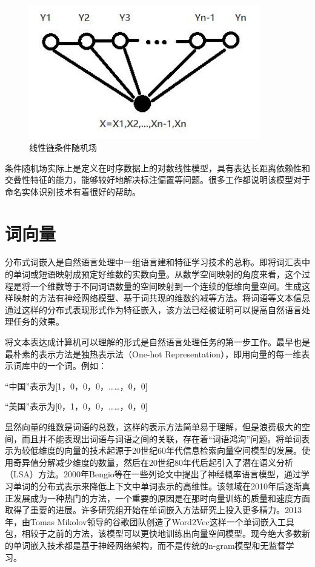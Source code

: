 \documentclass[winfonts,master,oneside,nobackinfo]{njuthesis}
\begin{document}
\begin{figure}[ht]
\centering
\begin{minipage}[t]{0.5\textwidth}
\includegraphics[width=0.9\textwidth]{./figure/线性链条件随机场.jpg}
\caption{线性链条件随机场}
\label{lab:1}
\end{minipage}
\end{figure}

条件随机场实际上是定义在时序数据上的对数线性模型，具有表达长距离依赖性和交叠性特征的能力，能够较好地解决标注偏置等问题。很多工作都说明该模型对于命名实体识别技术有着很好的帮助\cite{Settles}。

\section{词向量}
分布式词嵌入是自然语言处理中一组语言建和特征学习技术的总称。即将词汇表中的单词或短语映射成预定好维数的实数向量。从数学空间映射的角度来看，这个过程是将一个维数等于不同词语数量的空间映射到一个连续的低维向量空间。生成这样映射的方法有神经网络模型、基于词共现的维数约减等方法。将词语等文本信息通过这样的分布式表现形式作为特征嵌入，该方法已经被证明可以提高自然语言处理任务的效果。

将文本表达成计算机可以理解的形式是自然语言处理任务的第一步工作。最早也是最朴素的表示方法是独热表示法（One-hot Representation），即用向量的每一维表示词库中的一个词。例如：

“中国”表示为[1，0，0，0，……，0，0]

“美国”表示为[0，1，0，0，……，0，0]

显然向量的维数是词语的总数，这样的表示方法简单易于理解，但是浪费极大的空间，而且并不能表现出词语与词语之间的关联，存在着“词语鸿沟”问题。将单词表示为较低维度的向量的技术起源于20世纪60年代信息检索向量空间模型的发展。使用奇异值分解减少维度的数量，然后在20世纪80年代后起引入了潜在语义分析（LSA）方法。2000年Bengio等\cite{Bengio}在一些列论文中提出了神经概率语言模型，通过学习单词的分布式表示来降低上下文中单词表示的高维性。该领域在2010年后逐渐真正发展成为一种热门的方法，一个重要的原因是在那时向量训练的质量和速度方面取得了重要的进展。许多研究组开始在单词嵌入方法研究上投入更多精力。2013年，由Tomas Mikolov领导的谷歌团队创造了Word2Vec这样一个单词嵌入工具包\cite{word2vec}，相较于之前的方法，该模型可以更快地训练出向量空间模型。现今绝大多数新的单词嵌入技术都是基于神经网络架构，而不是传统的n-gram模型和无监督学习。
\end{document}
